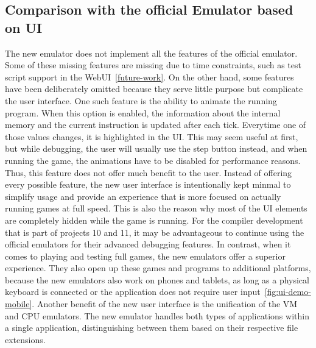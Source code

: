 
\subsection{Comparison with the official Emulator based on UI} \label{ui-compatibility}
The new emulator does not implement all the features of the official emulator.
Some of these missing features are missing due to time constraints, such as test script support in the WebUI~\ref{future-work}.
On the other hand, some features have been deliberately omitted because they serve little purpose but complicate the user interface.
One such feature is the ability to animate the running program.
When this option is enabled, the information about the internal memory and the current instruction is updated after each tick.
Everytime one of those values changes, it is highlighted in the UI.
This may seem useful at first, but while debugging, the user will usually use the step button instead, and when running the game, the animations have to be disabled for performance reasons.
Thus, this feature does not offer much benefit to the user.
Instead of offering every possible feature, the new user interface is intentionally kept minmal to simplify usage and provide an experience that is more focused on actually running games at full speed.
This is also the reason why most of the UI elements are completely hidden while the game is running.
For the compiler development that is part of projects 10 and 11, it may be advantageous to continue using the official emulators for their advanced debugging features.
In contrast, when it comes to playing and testing full games, the new emulators offer a superior experience.
They also open up these games and programs to additional platforms, because the new emulators also work on phones and tablets, as long as a physical keyboard is connected or the application does not require user input~\ref{fig:ui-demo-mobile}.
Another benefit of the new user interface is the unification of the VM and CPU emulators.
The new emulator handles both types of applications within a single application, distinguishing between them based on their respective file extensions.

